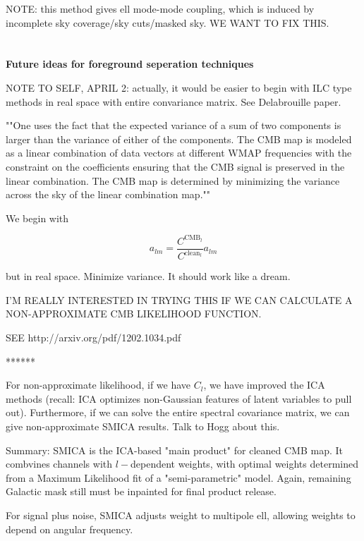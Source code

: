 \documentclass[a4paper, 11pt]{article}
\begin{document}
NOTE: this method gives ell mode-mode coupling, which is induced by incomplete sky coverage/sky cuts/masked sky. WE WANT TO FIX THIS. 


\paragraph{} \hspace{0pt} \\

\textbf{Future ideas for foreground seperation techniques}

NOTE TO SELF, APRIL 2: actually, it would be easier to begin with ILC type methods in real space with entire convariance matrix. See Delabrouille paper. 

""One uses the fact that the expected variance of a sum of two components is larger than the variance of either of the components. The CMB map is modeled as a linear combination of data vectors at different WMAP frequencies with the constraint on the coefficients ensuring that the CMB signal is preserved in the linear combination. The CMB map is determined by minimizing the variance across the sky of the linear combination map.""

We begin with 

$$
a_{lm}=\frac{C^{\text{CMB}_l}}{C^{\text{clean}_l}}a_{lm}
$$

but in real space. Minimize variance. It should work like a dream.

I'M REALLY INTERESTED IN TRYING THIS IF WE CAN CALCULATE A NON-APPROXIMATE CMB LIKELIHOOD FUNCTION. 

SEE http://arxiv.org/pdf/1202.1034.pdf

******

For non-approximate likelihood, if we have $C_l$, we have improved the ICA methods (recall: ICA optimizes non-Gaussian features of latent variables to pull out). Furthermore, if we can solve the entire spectral covariance matrix, we can give non-approximate SMICA results. Talk to Hogg about this. 

Summary: SMICA is the ICA-based "main product" for cleaned CMB map. It combvines channels with $l-$dependent weights, with optimal weights determined from a Maximum Likelihood fit of a "semi-parametric" model. Again, remaining Galactic mask still must be inpainted for final product release. 

For signal plus noise, SMICA adjusts weight to multipole ell, allowing weights to depend on angular frequency. 
\end{document}
